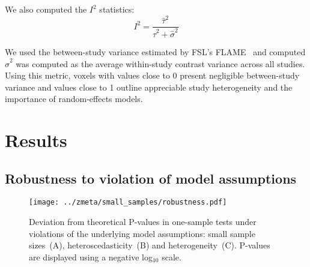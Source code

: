 \documentclass[preprint]{elsarticle}
\newcommand{\varBetween}{\tau^2}
\newcommand{\estvarBetween}{\hat\tau^2}
\newcommand{\nSubjects}[1][i]{n_{#1}}
\begin{document}
We also computed the $I^2$ statistics:
\begin{equation}
	I^2 = \frac{\estvarBetween}{\estvarBetween + \hat \sigma^2}
\end{equation}

We used the between-study variance estimated by FSL's FLAME~\cite{Smith2001} and computed $\hat \sigma^2$ was computed as the average within-study contrast variance across all studies. Using this metric, voxels with values close to 0 present negligible between-study variance and values close to 1 outline appreciable study heterogeneity and the importance of random-effects models.


\section{Results}\label{sec:results}

\subsection{Robustness to violation of model assumptions}

\begin{figure}[h]
	\centering
 	\texttt{[image: ../zmeta/small\_samples/robustness.pdf]}
	\caption{Deviation from theoretical P-values in one-sample tests under violations of the underlying model assumptions: small sample sizes~(A), heteroscedasticity~(B) and heterogeneity~(C). P-values are displayed using a negative log$_{10}$ scale.}
	\label{fig:robustness}
\end{figure}


\end{document}

